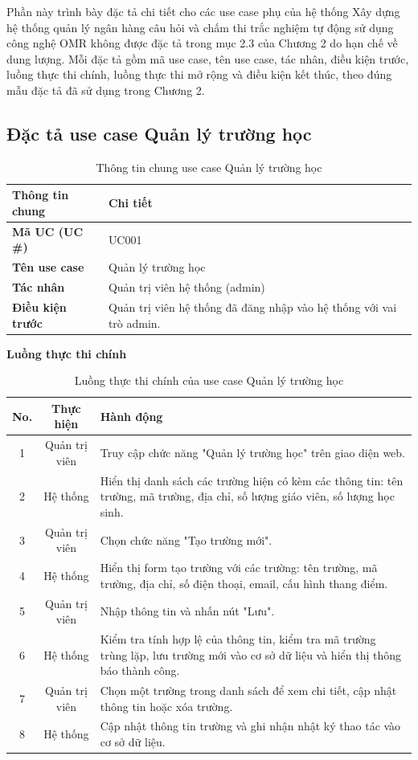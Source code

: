 ﻿\documentclass[../DoAn.tex]{subfiles}
\begin{document}
Phần này trình bày đặc tả chi tiết cho các use case phụ của hệ thống Xây dựng hệ thống quản lý ngân hàng câu hỏi và chấm thi trắc nghiệm tự động sử dụng công nghệ OMR không được đặc tả trong mục 2.3 của Chương 2 do hạn chế về dung lượng. Mỗi đặc tả gồm mã use case, tên use case, tác nhân, điều kiện trước, luồng thực thi chính, luồng thực thi mở rộng và điều kiện kết thúc, theo đúng mẫu đặc tả đã sử dụng trong Chương 2.

\subsection{Đặc tả use case Quản lý trường học}
\label{subsection:appendix:B.1}
\begin{table}[H]
\centering
\begin{tabular}{|p{4cm}|p{10cm}|}
\hline
\textbf{Thông tin chung} & \textbf{Chi tiết} \\ \hline
\textbf{Mã UC (UC \#)} & UC001 \\ \hline
\textbf{Tên use case} & Quản lý trường học \\ \hline
\textbf{Tác nhân} & Quản trị viên hệ thống (admin) \\ \hline
\textbf{Điều kiện trước} & Quản trị viên hệ thống đã đăng nhập vào hệ thống với vai trò admin. \\ \hline
\end{tabular}
\caption{Thông tin chung use case Quản lý trường học}
\label{table:appendix:B.1_info}
\end{table}
\noindent\textbf{Luồng thực thi chính}
\begin{table}[H]
\centering
\begin{tabular}{|c|c|p{9cm}|}
\hline
\textbf{No.} & \textbf{Thực hiện} & \textbf{Hành động} \\ \hline
1 & Quản trị viên & Truy cập chức năng "Quản lý trường học" trên giao diện web. \\ \hline
2 & Hệ thống & Hiển thị danh sách các trường hiện có kèm các thông tin: tên trường, mã trường, địa chỉ, số lượng giáo viên, số lượng học sinh. \\ \hline
3 & Quản trị viên & Chọn chức năng "Tạo trường mới". \\ \hline
4 & Hệ thống & Hiển thị form tạo trường với các trường: tên trường, mã trường, địa chỉ, số điện thoại, email, cấu hình thang điểm. \\ \hline
5 & Quản trị viên & Nhập thông tin và nhấn nút "Lưu". \\ \hline
6 & Hệ thống & Kiểm tra tính hợp lệ của thông tin, kiểm tra mã trường trùng lặp, lưu trường mới vào cơ sở dữ liệu và hiển thị thông báo thành công. \\ \hline
7 & Quản trị viên & Chọn một trường trong danh sách để xem chi tiết, cập nhật thông tin hoặc xóa trường. \\ \hline
8 & Hệ thống & Cập nhật thông tin trường và ghi nhận nhật ký thao tác vào cơ sở dữ liệu. \\ \hline
\end{tabular}
\caption{Luồng thực thi chính của use case Quản lý trường học}
\label{table:appendix:B.1_main}
\end{table}
\end{document}
